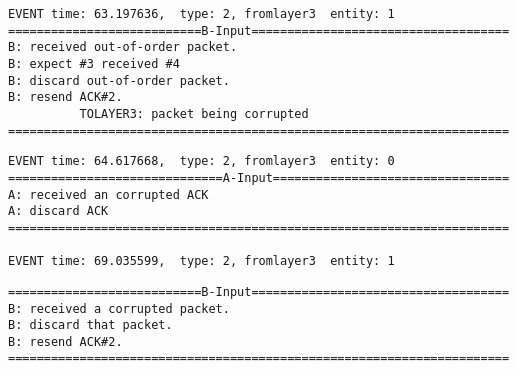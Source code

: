 \documentclass[12pt]{article}
\begin{document}
\begin{Verbatim}[frame=single, rulecolor=\color{cyan}, label=Handle out-of-order/duplicate] 
EVENT time: 63.197636,  type: 2, fromlayer3  entity: 1
===========================B-Input====================================
B: received out-of-order packet.
B: expect #3 received #4
B: discard out-of-order packet.
B: resend ACK#2.
          TOLAYER3: packet being corrupted
======================================================================
\end{Verbatim}
\begin{verbatim}
EVENT time: 64.617668,  type: 2, fromlayer3  entity: 0
==============================A-Input=================================
A: received an corrupted ACK 
A: discard ACK
======================================================================

EVENT time: 69.035599,  type: 2, fromlayer3  entity: 1
\end{verbatim}
\begin{Verbatim}[frame=single, rulecolor=\color{blue}, label=Handle corruption] 
===========================B-Input====================================
B: received a corrupted packet.
B: discard that packet.
B: resend ACK#2.
======================================================================
\end{Verbatim}
\end{document}

